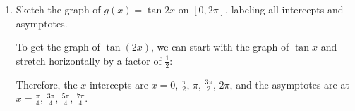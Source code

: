 \documentclass{article}
\begin{document}
\begin{enumerate}
\begin{enumerate}
  \item
    \begin{problem}
      Meredith has a follow-up
      question.  She says, "the graph of $y=\frac{f(x)}{g(x)}$ must have vertical
      asymptotes whenever $g(x)= 0$, no matter what $f(x)$ and $g(x)$ are, right?''  Give Meredith an
      example to show her that this is not correct. 
    \end{problem}

    \begin{solution}
      A simple example is the function $y = \frac{x}{x}$; the
      denominator is 0 at $x = 0$, but the graph has a hole at $x = 0$, not a
      vertical asymptote.
    \end{solution}

  \end{enumerate}

\item
    \begin{problem}[\vfill]
      Sketch the graph of $g(x) = \tan 2x$ on $[0, 2 \pi]$,
      labeling all intercepts and asymptotes.
    \end{problem}

    \begin{solution}
      To get the graph of $\tan (2x)$, we can start with the graph of
      $\tan x$ and stretch horizontally by a factor of $\frac{1}{2}$:
      \begin{center}        
      \end{center}
      Therefore, the $x$-intercepts are $x = 0$, $\frac{\pi }{2}$, $\pi$,
      $\frac{3 \pi }{2}$, $2 \pi$, and the asymptotes are at $x =
      \frac{\pi }{4}$, $\frac{3 \pi }{4}$, $\frac{5 \pi }{4}$, $\frac{7
        \pi }{4}$.              
    \end{solution}   



\end{enumerate}
\end{document}

